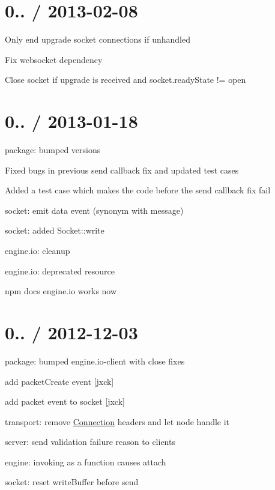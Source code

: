 \section*{0.. / 2013-\/02-\/08 }


\begin{DoxyItemize}
\item Only end upgrade socket connections if unhandled
\item Fix websocket dependency
\item Close socket if upgrade is received and socket.\+ready\+State != open
\end{DoxyItemize}

\section*{0.. / 2013-\/01-\/18 }


\begin{DoxyItemize}
\item package\+: bumped versions
\item Fixed bugs in previous send callback fix and updated test cases
\item Added a test case which makes the code before the send callback fix fail
\item socket\+: emit {\ttfamily data} event (synonym with {\ttfamily message})
\item socket\+: added {\ttfamily Socket\+::write}
\item engine.\+io\+: cleanup
\item engine.\+io\+: deprecated {\ttfamily resource}
\item {\ttfamily npm docs engine.\+io} works now
\end{DoxyItemize}

\section*{0.. / 2012-\/12-\/03 }


\begin{DoxyItemize}
\item package\+: bumped {\ttfamily engine.\+io-\/client} with {\ttfamily close} fixes
\item add packet\+Create event \mbox{[}jxck\mbox{]}
\item add packet event to socket \mbox{[}jxck\mbox{]}
\item transport\+: remove {\ttfamily \mbox{\hyperlink{class_connection}{Connection}}} headers and let node handle it
\item server\+: send validation failure reason to clients
\item engine\+: invoking as a function causes attach
\item socket\+: reset {\ttfamily write\+Buffer} before send
\end{DoxyItemize}

